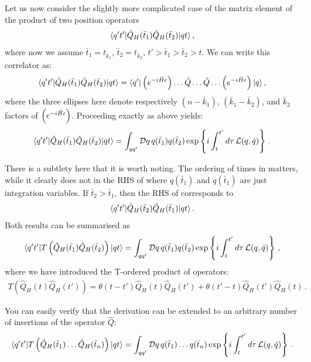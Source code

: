 Let us now consider the slightly more complicated case of the matrix
element of the product of two position operators
\begin{align}
  \label{eq:TwoPtDef}
  \langle q't' | \hat{Q}_H(\bar{t}_1) \hat{Q}_H(\bar{t}_2)| qt \rangle\, , 
\end{align}
where now we assume $\bar{t}_1=t_{\bar k_1}$, $\bar{t}_2=t_{\bar k_2}$,
$t'>\bar{t}_1>\bar{t}_2>t$. We can write this correlator as:
\begin{align}
    \langle q't' | \hat{Q}_H(\bar{t}_1) \hat{Q}_H(\bar{t}_2)| qt \rangle = 
  \langle q' | \left(e^{-i \hat{H} \epsilon}\right) \dots \hat{Q} \ldots \hat{Q} \ldots \left(e^{-i \hat{H} \epsilon}\right)
  | q \rangle\, ,
\end{align}
where the three ellipses here denote respectively 
$(n-\bar k_1)$, $(\bar k_1-\bar k_2)$,
and $\bar k_2$ factors of $\left(e^{-i \hat{H} \epsilon}\right)$. Proceeding exactly as above yields: 
\begin{align}
  \label{eq:TwoPtPathInt}
  \langle q't' | \hat{Q}_H(\bar{t}_1) \hat{Q}_H(\bar{t}_2)| qt \rangle = 
  \int_{qq'} \mathcal{D}q\, q(\bar{t}_1) q(\bar{t}_2) 
  \exp \left\{
  i \int_t^{t'} d\tau\, \mathcal{L}(q,\dot{q})
  \right\}\, .
\end{align}

There is a subtlety here that it is worth noting. The ordering of
times in  matters, while it clearly does not in the
RHS of  where $q(\bar{t}_1)$ and $q(\bar{t}_1)$
are just integration variables. If $\bar{t}_2>\bar{t}_1$, then the RHS
of  corresponds to
\begin{align}
  \langle q't' | \hat{Q}_H(\bar{t}_2) \hat{Q}_H(\bar{t}_1) | qt \rangle\, .
\end{align}
Both results can be summarised as
\begin{align}
  \label{eq:TOrderPathInt}
  \langle q't' | T\left(\hat{Q}_H(\bar{t}_1) \hat{Q}_H(\bar{t}_2)
  \right)| qt \rangle = 
  \int_{qq'} \mathcal{D}q\, q(\bar{t}_1) q(\bar{t}_2) 
  \exp \left\{
  i \int_t^{t'} d\tau\, \mathcal{L}(q,\dot{q})
  \right\}\, ,
\end{align}
where we have introduced the T-ordered product of operators: 
\begin{align}
  \label{eq:TOrderDef}
   T\left(\hat{Q}_H(t) \hat{Q}_H(t')\right) = \theta(t-t') \hat{Q}_H(t)
  \hat{Q}_H(t') + \theta(t'-t) \hat{Q}_H(t') \hat{Q}_H(t)\, .
\end{align}

You can easily verify that the derivation can be extended to
an arbitrary number of insertions of the operator $\hat{Q}$:
\begin{align}
\label{eq:TOrderNPt}
\langle q't' | T\left(\hat{Q}_H(\bar{t}_1) \ldots \hat{Q}_H(\bar{t}_n)
  \right)| qt \rangle = 
  \int_{qq'} \mathcal{D}q\, q(\bar{t}_1) \ldots q(\bar{t}_n) 
  \exp \left\{
  i \int_t^{t'} d\tau\, \mathcal{L}(q,\dot{q})
  \right\}\, .
\end{align}

